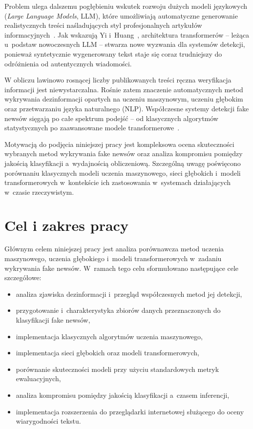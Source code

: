 \documentclass[oneside,polski,logo]{amuthesis}
\begin{document}
Problem ulega dalszemu pogłębieniu wskutek rozwoju dużych modeli językowych (\textit{Large Language Models}, LLM), które umożliwiają automatyczne generowanie realistycznych treści naśladujących styl profesjonalnych artykułów informacyjnych~\cite{Li2024}. Jak wskazują Yi i~Huang~\cite{Yi2025}, architektura transformerów -- leżąca u~podstaw nowoczesnych LLM -- stwarza nowe wyzwania dla systemów detekcji, ponieważ syntetycznie wygenerowany tekst staje się coraz trudniejszy do odróżnienia od autentycznych wiadomości.

W obliczu lawinowo rosnącej liczby publikowanych treści ręczna weryfikacja informacji jest niewystarczalna. Rośnie zatem znaczenie automatycznych metod wykrywania dezinformacji opartych na uczeniu maszynowym, uczeniu głębokim oraz przetwarzaniu języka naturalnego (NLP). Współczesne systemy detekcji fake newsów sięgają po całe spektrum podejść -- od klasycznych algorytmów statystycznych po zaawansowane modele transformerowe~\cite{Alshuwaier2025}.

Motywacją do podjęcia niniejszej pracy jest kompleksowa ocena skuteczności wybranych metod wykrywania fake newsów oraz analiza kompromisu pomiędzy jakością klasyfikacji a~wydajnością obliczeniową. Szczególną uwagę poświęcono porównaniu klasycznych modeli uczenia maszynowego, sieci głębokich i~modeli transformerowych w~kontekście ich zastosowania w~systemach działających w~czasie rzeczywistym.

\section{Cel i zakres pracy}
Głównym celem niniejszej pracy jest analiza porównawcza metod uczenia maszynowego, uczenia głębokiego i~modeli transformerowych w~zadaniu wykrywania fake newsów. W~ramach tego celu sformułowano następujące cele szczegółowe:
\begin{itemize} 
    \item analiza zjawiska dezinformacji i~przegląd współczesnych metod jej detekcji,
    \item przygotowanie i~charakterystyka zbiorów danych przeznaczonych do klasyfikacji fake newsów,
    \item implementacja klasycznych algorytmów uczenia maszynowego,
    \item implementacja sieci głębokich oraz modeli transformerowych,
    \item porównanie skuteczności modeli przy użyciu standardowych metryk ewaluacyjnych,
    \item analiza kompromisu pomiędzy jakością klasyfikacji a~czasem inferencji,
    \item implementacja rozszerzenia do przeglądarki internetowej służącego do oceny wiarygodności tekstu.
\end{itemize}
\end{document}
